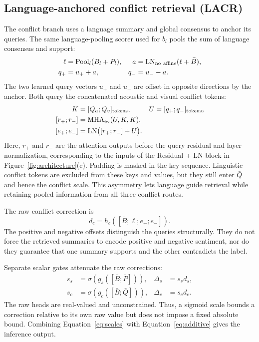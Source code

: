 \documentclass[review,12pt]{elsarticle}
\newcommand{\pool}{\operatorname{Pool}}
\newcommand{\MHA}{\operatorname{MHA}}
\newcommand{\LN}{\operatorname{LN}}
\begin{document}
\subsection{Language-anchored conflict retrieval (LACR)}
The conflict branch uses a language summary and global consensus to anchor its queries. The same language-pooling scorer used for $b_l$ pools the sum of language consensus and support:
\begin{align}
\ell&=\pool_l(B_l+P_l),& a&=\LN_{\rm no\ affine}(\ell+\bar B),\nonumber\\
q_+&=u_++a,& q_-&=u_--a.
\label{eq:anchor}
\end{align}
The two learned query vectors $u_+$ and $u_-$ are offset in opposite directions by the anchor. Both query the concatenated acoustic and visual conflict tokens:
\begin{align}
K&=[Q_a;Q_v]_{\rm tokens},& U&=[q_+;q_-]_{\rm tokens},\nonumber\\
[r_+;r_-]&=\MHA_{\rm ev}(U,K,K),\nonumber\\
[e_+;e_-]&=\LN\bigl([r_+;r_-]+U\bigr).
\label{eq:conflict_attention}
\end{align}
Here, $r_+$ and $r_-$ are the attention outputs before the query residual and layer normalization, corresponding to the inputs of the Residual + LN block in Figure~\ref{fig:architecture}(c). Padding is masked in the key sequence. Linguistic conflict tokens are excluded from these keys and values, but they still enter $\bar Q$ and hence the conflict scale. This asymmetry lets language guide retrieval while retaining pooled information from all three conflict routes.

The raw conflict correction is
\begin{equation}
d_c=h_c([\bar B;\ell;e_+;e_-]).
\label{eq:raw_conflict}
\end{equation}
The positive and negative offsets distinguish the queries structurally. They do not force the retrieved summaries to encode positive and negative sentiment, nor do they guarantee that one summary supports and the other contradicts the label.

Separate scalar gates attenuate the raw corrections:
\begin{align}
s_s&=\sigma(g_s([\bar B;\bar P])),&\Delta_s&=s_s d_s,\\
s_c&=\sigma(g_c([\bar B;\bar Q])),&\Delta_c&=s_c d_c.
\label{eq:scales}
\end{align}
The raw heads are real-valued and unconstrained. Thus, a sigmoid scale bounds a correction relative to its own raw value but does not impose a fixed absolute bound. Combining Equation~\eqref{eq:scales} with Equation~\eqref{eq:additive} gives the inference output.
\end{document}
